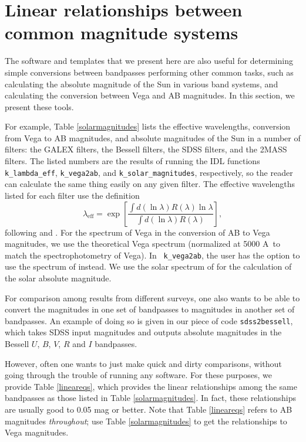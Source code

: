 \documentclass[12pt,preprint]{aastex}
\renewcommand{\AA}{A}
\begin{document}
\section{Linear relationships between common magnitude systems}
\label{sdss2bessell}

The software and templates that we present here are also useful for
determining simple conversions between bandpasses performing other
common tasks, such as calculating the absolute magnitude of the Sun in
various band systems, and calculating the conversion between Vega and
AB magnitudes. In this section, we present these tools.

For example, Table \ref{solarmagnitudes} lists the effective
wavelengths, conversion from Vega to AB magnitudes, and absolute
magnitudes of the Sun in a number of filters: the GALEX filters, the
Bessell filters, the SDSS filters, and the 2MASS filters. The listed
numbers are the results of running the IDL functions {\tt
k\_lambda\_eff}, {\tt k\_vega2ab}, and {\tt k\_solar\_magnitudes},
respectively, so the reader can calculate the same thing easily on any
given filter.  The effective wavelengths listed for each filter use
the definition
\begin{equation}
\label{lden}
\lambda_{\mathrm{eff}} = \exp\left[ 
\frac{\int d(\ln\lambda) R(\lambda) \ln\lambda}
{\int d(\ln\lambda) R(\lambda)} \right],
\end{equation}
following \citet{fukugita96a} and \citet{schneider83a}.  For the
spectrum of Vega in the conversion of AB to Vega magnitudes, we use
the \citet{kurucz91a} theoretical Vega spectrum (normalized at 5000
\AA\ to match the \citet{hayes85a} spectrophotometry of Vega). In {\tt
k\_vega2ab}, the user has the option to use the spectrum of
\citet{hayes85a} instead.  We use the solar spectrum of
\citet{kurucz91a} for the calculation of the solar absolute magnitude.

For comparison among results from different surveys, one also wants to
be able to convert the magnitudes in one set of bandpasses to
magnitudes in another set of bandpasses. An example of doing so is
given in our piece of code {\tt sdss2bessell}, which takes SDSS input
magnitudes and outputs absolute magnitudes in the Bessell $U$, $B$,
$V$, $R$ and $I$ bandpasses. 

However, often one wants to just make quick and dirty comparisons,
without going through the trouble of running any software. For these
purposes, we provide Table \ref{lineareqs}, which provides the linear
relationships among the same bandpasses as those listed in Table
\ref{solarmagnitudes}. In fact, these relationships are usually good
to 0.05 mag or better. Note that Table \ref{lineareqs} refers to AB
magnitudes {\it throughout}; use Table \ref{solarmagnitudes} to get
the relationships to Vega magnitudes.
\end{document}
